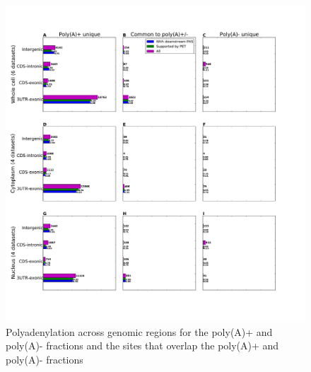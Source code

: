 \begin{figure}[htb]
	\begin{center}
		\includegraphics[scale=0.3]{figures/polyadenylation/intersected_sidebars_pA_2+.pdf}
	\end{center}
	\caption{Polyadenylation across genomic regions for the poly(A)+ and poly(A)-
	fractions and the sites that overlap the poly(A)+ and poly(A)- fractions}
	\label{fig:sidebars_intersect}
\end{figure}

